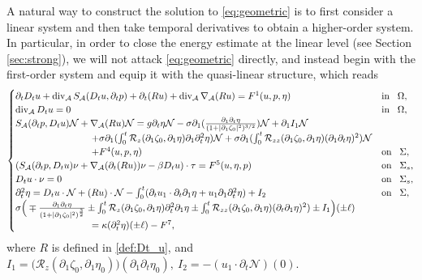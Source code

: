 \documentclass[letterpaper,reqno,10pt,twoside]{amsart}
\theoremstyle{definition}
\theoremstyle{remark}
\def\p{\partial}
\def\dive{\mathop{\rm div}\nolimits}
\begin{document}
	A natural way to construct the solution to \eqref{eq:geometric} is to first consider a linear system and then take temporal derivatives to obtain a higher-order system. In particular, in order to close the energy estimate at the linear level (see Section \ref{sec:strong}), we will not attack \eqref{eq:geometric} directly, and instead begin with the first-order system and equip it with the quasi-linear structure, which reads
	\begin{equation}\label{eq:first}
		\begin{cases}
			\partial_{t}D_{t}u+\operatorname{div}_{\mathcal{A}}S_{\mathcal{A}}(D_{t}u,\p_{t}p)+\p_{t}(Ru)+\dive_{\mathcal{A}}\nabla_{\mathcal{A}}(Ru)=F^{1}(u,p,\eta)~~~&\operatorname{in}~~\Omega,\\
			\operatorname{div}_{\mathcal{A}}D_{t}u=0~~~&\operatorname{in}~~\Omega,\\
			S_{\mathcal{A}}(\p_{t}p,D_{t}u)\mathcal{N}+\nabla_{\mathcal{A}}(Ru)\mathcal{N}=g\p_{t}\eta\mathcal{N}-\sigma\partial_{1}(\frac{\p_1\p_t\eta}{(1+\vert \partial_{1}\zeta_{0}\vert^{2})^{3/2}})\mathcal{N}+\p_{1}I_{1}\mathcal{N}\\
			\quad\quad\quad\quad\quad\quad\quad\quad+\sigma\partial_{1}(\int_{0}^{t}\mathcal{R}_{z}(\partial_{1}\zeta_{0},\partial_{1}\eta)\partial_{1}\partial_{t}^{2}\eta)\mathcal{N}+\sigma\partial_{1}(\int_{0}^{t}\mathcal{R}_{zz}(\partial_{1}\zeta_{0},\partial_{1}\eta)(\partial_{1}\partial_{t}\eta)^{2})\mathcal{N}\\
			\quad\quad\quad\quad\quad\quad\quad\quad+F^{4}(u,p,\eta)~~&\operatorname{on}~~\Sigma,\\
			(S_{\mathcal{A}}(\p_{t}p,D_{t}u)\nu+\nabla_{\mathcal{A}}(\p_{t}(Ru))\nu-\beta D_{t}u)\cdot \tau=F^{5}(u,\eta,p)~~~&\operatorname{on}~~\Sigma_{s},\\
			D_{t}u\cdot \nu=0~~~&\operatorname{on}~~\Sigma_{s},\\
			\partial_{t}^{2}\eta=D_{t}u\cdot \mathcal{N}+(Ru)\cdot \mathcal{N} -\int_{0}^{t}(\partial_{t}u_{1}\cdot\partial_{t}\p_1\eta+u_{1}\partial_{1}\partial_{t}^{2}\eta)+I_{2}~~~&\operatorname{on}~~\Sigma,\\
			\sigma\Big(\mp \frac{\partial_{1}\p_{t}\eta}{(1+\vert \partial_{1}\zeta_{0}\vert^{2})^{\frac{3}{2}}}\pm \int_{0}^{t}\mathcal{R}_{z}(\partial_{1}\zeta_{0},\partial_{1}\eta)\partial_{t}^{2}\partial_{1}\eta\pm\int_{0}^{t}\mathcal{R}_{zz}(\partial_{1}\zeta_{0},\partial_{1}\eta)(\partial_{t}\partial_{1}\eta)^{2})\pm I_{1} \Big)(\pm \ell)\\
			\quad\quad\quad\quad\quad\quad\quad\quad =\kappa (\partial_{t}^{2}\eta)(\pm \ell)-{F}^{7},
		\end{cases}
	\end{equation}
	\noindent where $R$ is defined in \eqref{def:Dt_u}, and
	$ I_{1}=\big(\mathcal{R}_{z}(\p_{1}\zeta_{0},\p_{1}\eta_{0})\big)(\p_{1}\p_{t}\eta_{0}), \
	I_{2}= -(u_{1}\cdot \partial_{t}\mathcal{N})(0)$.
	
\end{document}
